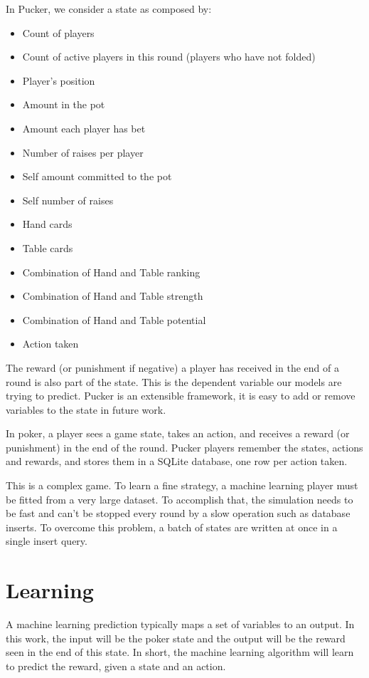 In Pucker, we consider a state as composed by:
\begin{itemize}
  \item Count of players
  \item Count of active players in this round (players who have not folded)
  \item Player's position
  \item Amount in the pot
  \item Amount each player has bet
  \item Number of raises per player
  \item Self amount committed to the pot
  \item Self number of raises
  \item Hand cards
  \item Table cards
  \item Combination of Hand and Table ranking
  \item Combination of Hand and Table strength
  \item Combination of Hand and Table potential
  \item Action taken
\end{itemize}

The reward (or punishment if negative) a player has received in the end of a round is also part of the state. This is the dependent variable our models are trying to predict. Pucker is an extensible framework, it is easy to add or remove variables to the state in future work.

In poker, a player sees a game state, takes an action, and receives a reward (or punishment) in the end of the round. Pucker players remember the states, actions and rewards, and stores them in a SQLite database, one row per action taken.

This is a complex game. To learn a fine strategy, a machine learning player must be fitted from a very large dataset. To accomplish that, the simulation needs to be fast and can't be stopped every round by a slow operation such as database inserts. To overcome this problem, a batch of states are written at once in a single insert query.

\section{Learning}
\label{sec:Learning}

A machine learning prediction typically maps a set of variables to an output. In this work, the input will be the poker state and the output will be the reward seen in the end of this state. In short, the machine learning algorithm will learn to predict the reward, given a state and an action.

